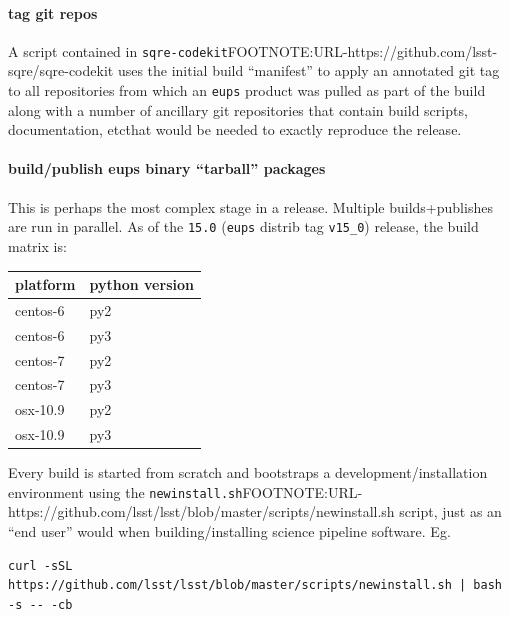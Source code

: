 \paragraph{tag git repos}

A script contained in
\texttt{sqre-codekit}FOOTNOTE:URL-https://github.com/lsst-sqre/sqre-codekit
uses the initial build ``manifest'' to apply an annotated git tag to all
repositories from which an \texttt{eups} product was pulled as part of the
build along with a number of ancillary git repositories that contain build
scripts, documentation, etc\. that would be needed to exactly reproduce the
release.

\paragraph{build/publish eups binary ``tarball'' packages}

This is perhaps the most complex stage in a release.  Multiple builds+publishes
are run in parallel.  As of the \texttt{15.0} (\texttt{eups} distrib tag
\texttt{v15\_0}) release, the build matrix is:

\begin{center}
    \begin{tabular}{| l | l |}
        \hline
        platform & python version \\ \hline
        centos-6 & py2 \\ \hline
        centos-6 & py3 \\ \hline
        centos-7 & py2 \\ \hline
        centos-7 & py3 \\ \hline
        osx-10.9 & py2 \\ \hline
        osx-10.9 & py3 \\
        \hline
    \end{tabular}
\end{center}

Every build is started from scratch and bootstraps a development/installation environment using the \texttt{newinstall.sh}FOOTNOTE:URL-https://github.com/lsst/lsst/blob/master/scripts/newinstall.sh script, just as an ``end user'' would when building/installing science pipeline software. Eg.

\begin{verbatim}
curl -sSL https://github.com/lsst/lsst/blob/master/scripts/newinstall.sh | bash -s -- -cb
\end{verbatim}

